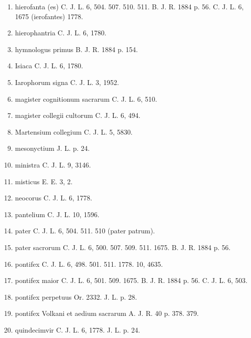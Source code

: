 \documentclass[a4paper, 11pt, oneside, polutonikogreek, german]{article}
\begin{document}
\begin{enumerate}
\item hierofanta (es) C. J. L. 6, 504. 507. 510. 511. B. J. R. 1884 p. 56. C. J. L. 6, 1675 (ierofantes) 1778.

\item hierophantria C. J. L. 6, 1780.

\item hymnologus primus B. J. R. 1884 p. 154.

\item Isiaca C. J. L. 6, 1780.

\item Iarophorum signa C. J. L. 3, 1952.

\item magister cognitionum sacrarum C. J. L. 6, 510.

\item magister collegii cultorum C. J. L. 6, 494.

\item Martensium collegium C. J. L. 5, 5830.

\item mesonyctium J. L. p. 24.

\item ministra C. J. L. 9, 3146.

\item misticus E. E. 3, 2.

\item neocorus C. J. L. 6, 1778.

\item pantelium C. J. L. 10, 1596.

\item pater C. J. L. 6, 504. 511. 510 (pater patrum).

\item pater sacrorum C. J. L. 6, 500. 507. 509. 511. 1675. B. J. R. 1884 p. 56.

\item pontifex C. J. L. 6, 498. 501. 511. 1778. 10, 4635.

\item pontifex maior C. J. L. 6, 501. 509. 1675. B. J. R. 1884 p. 56. C. J. L. 6, 503.

\item pontifex perpetuus Or. 2332. J. L. p. 28.

\item pontifex Volkani et aedium sacrarum A. J. R. 40 p. 378. 379.

\item quindecimvir C. J. L. 6, 1778. J. L. p. 24.


\end{enumerate}
\end{document}
